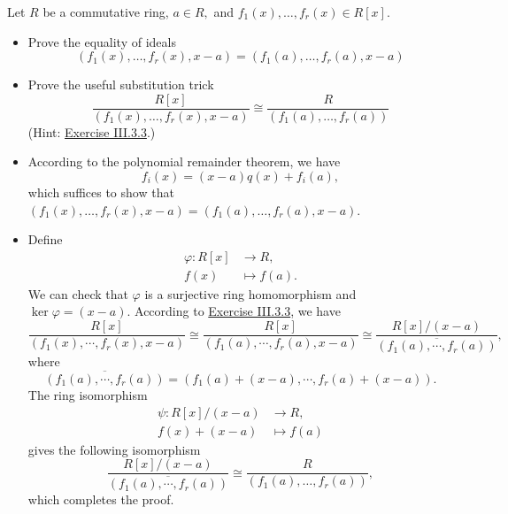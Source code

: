 \documentclass[12pt,letterpaper,boxed]{hmcpset}
\begin{document}
\begin{problem}[4.11]
	Let $R$ be a commutative ring, $a \in R,$ and $f_{1}(x), \ldots, f_{r}(x) \in R[x]$.
	\begin{itemize}
		\item Prove the equality of ideals
		\[
		\left(f_{1}(x), \ldots, f_{r}(x), x-a\right)=\left(f_{1}(a), \ldots, f_{r}(a), x-a\right)
		\]
		\item Prove the useful substitution trick
		\[
		\frac{R[x]}{\left(f_{1}(x), \ldots, f_{r}(x), x-a\right)} \cong \frac{R}{\left(f_{1}(a), \ldots, f_{r}(a)\right)}
		\]
		(Hint: \hyperlink{Exercise III.3.3}{Exercise III.3.3}.)
	\end{itemize}	
\end{problem}
\begin{solution}
	\begin{itemize}
		\item According to the polynomial remainder theorem, we have 
		\[
		f_i(x)=(x-a)q(x)+f_i(a),
		\]
		which suffices to show that $\left(f_{1}(x), \ldots, f_{r}(x), x-a\right)=\left(f_{1}(a), \ldots, f_{r}(a), x-a\right)$.
		\item Define
		\begin{align*}
		\varphi:R[x]& \longrightarrow R,\\
		f(x)& \longmapsto f(a).
		\end{align*}
		We can check that $\varphi$ is a surjective ring homomorphism and $\ker\varphi=(x-a)$. According to \hyperlink{Exercise III.3.3}{Exercise III.3.3}, we have
		\[
		\frac{R[x]}{\left(f_{1}(x), \cdots, f_{r}(x), x-a\right)}\cong\frac{R[x]}{\left(f_{1}(a), \cdots, f_{r}(a), x-a\right)}\cong \frac{R[x] / (x-a)}{\overline{\left(f_{1}(a), \cdots, f_{r}(a)\right)}},
		\]
		where
		\[
		\overline{\left(f_{1}(a), \cdots, f_{r}(a)\right)}=\left(f_{1}(a)+(x-a), \cdots, f_{r}(a)+(x-a)\right).
		\]
		The ring isomorphism 
		\begin{align*}
		\psi:R[x]/(x-a)& \longrightarrow R,\\
		f(x)+(x-a)& \longmapsto f(a)
		\end{align*}
		gives the following isomorphism 
		\[
		\frac{R[x] / (x-a)}{\overline{\left(f_{1}(a), \cdots, f_{r}(a)\right)}}\cong \frac{R}{\left(f_{1}(a), \ldots, f_{r}(a)\right)},
		\]
		which completes the proof.
	\end{itemize}
\end{solution}
\end{document}
